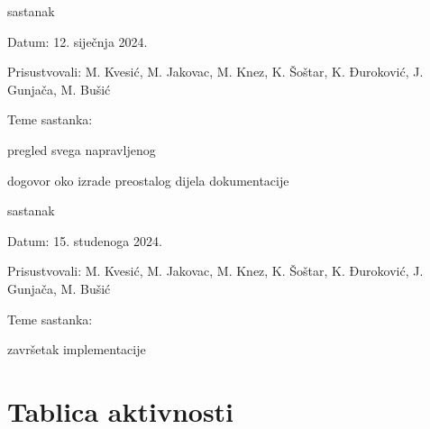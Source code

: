 \begin{packed_enum}
			\item  sastanak
			\item[] \begin{packed_item}
				\item Datum: 12. siječnja 2024.
				\item Prisustvovali: M. Kvesić, M. Jakovac, M. Knez, K. Šoštar, K. Đuroković, J. Gunjača, M. Bušić
				\item Teme sastanka:
				\begin{packed_item}
					\item  pregled svega napravljenog
					\item  dogovor oko izrade preostalog dijela dokumentacije
				\end{packed_item}
			\end{packed_item}
			\item  sastanak
			\item[] \begin{packed_item}
				\item Datum: 15. studenoga 2024.
				\item Prisustvovali: M. Kvesić, M. Jakovac, M. Knez, K. Šoštar, K. Đuroković, J. Gunjača, M. Bušić
				\item Teme sastanka:
				\begin{packed_item}
					\item  završetak implementacije
				\end{packed_item}
			\end{packed_item}
			
			 
			
			
		\end{packed_enum}
		
		\eject
		\section*{Tablica aktivnosti}
		

